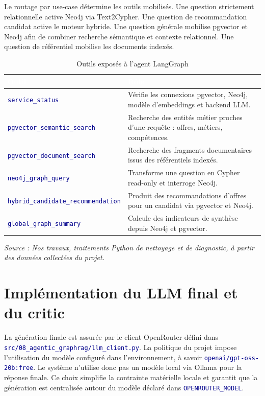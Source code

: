 \documentclass[12pt,twoside]{report}
\newcommand{\source}[1]{%
  \par\vspace{0.2\baselineskip}
  {\centering\footnotesize\itshape Source : #1\par}
}
\newcommand{\filevar}[1]{\texttt{\textcolor{darkblue}{#1}}}
\newcommand{\tabheader}[1]{\textcolor{white}{\textbf{#1}}}
\newcommand{\tableStyleStart}{%
  \small
  \renewcommand{\arraystretch}{1.12}%
  \setlength{\tabcolsep}{4pt}%
  \rowcolors{2}{lightblue!12}{white}%
}
\newcommand{\tableStyleEnd}{%
  \rowcolors{2}{}{}%
  \renewcommand{\arraystretch}{1}%
}
\begin{document}
Le routage par use-case détermine les outils mobilisés. Une question strictement relationnelle active Neo4j via Text2Cypher. Une question de recommandation candidat active le moteur hybride. Une question générale mobilise pgvector et Neo4j afin de combiner recherche sémantique et contexte relationnel. Une question de référentiel mobilise les documents indexés.

\begin{table}[H]
  \centering
  \caption{Outils exposés à l'agent LangGraph}
  \label{tab:tools_agent_chap3}
  \tableStyleStart
  \begin{tabularx}{\textwidth}{p{4.3cm}X}
    \rowcolor{darkblue}
    \tabheader{Outil} & \tabheader{Rôle} \\
    \midrule
    \filevar{service\_status} & Vérifie les connexions pgvector, Neo4j, modèle d'embeddings et backend LLM. \\
    \filevar{pgvector\_semantic\_search} & Recherche des entités métier proches d'une requête : offres, métiers, compétences. \\
    \filevar{pgvector\_document\_search} & Recherche des fragments documentaires issus des référentiels indexés. \\
    \filevar{neo4j\_graph\_query} & Transforme une question en Cypher read-only et interroge Neo4j. \\
    \filevar{hybrid\_candidate\_recommendation} & Produit des recommandations d'offres pour un candidat via pgvector et Neo4j. \\
    \filevar{global\_graph\_summary} & Calcule des indicateurs de synthèse depuis Neo4j et pgvector. \\
    \bottomrule
  \end{tabularx}
  \tableStyleEnd
  \source{Nos travaux, traitements Python de nettoyage et de diagnostic, à partir des données collectées du projet.}
\end{table}

\section{Implémentation du LLM final et du critic}

La génération finale est assurée par le client OpenRouter défini dans \filevar{src/08\_agentic\_graphrag/llm\_client.py}. La politique du projet impose l'utilisation du modèle configuré dans l'environnement, à savoir \filevar{openai/gpt-oss-20b:free}. Le système n'utilise donc pas un modèle local via Ollama pour la réponse finale. Ce choix simplifie la contrainte matérielle locale et garantit que la génération est centralisée autour du modèle déclaré dans \filevar{OPENROUTER\_MODEL}.
\end{document}
